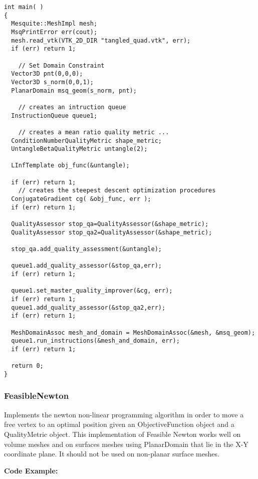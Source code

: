 \begin{lstlisting}[frame=single]
int main( )
{
  Mesquite::MeshImpl mesh;
  MsqPrintError err(cout);
  mesh.read_vtk(VTK_2D_DIR "tangled_quad.vtk", err);
  if (err) return 1;
  
    // Set Domain Constraint
  Vector3D pnt(0,0,0);
  Vector3D s_norm(0,0,1);
  PlanarDomain msq_geom(s_norm, pnt);
                                                                              
    // creates an intruction queue
  InstructionQueue queue1;
  
    // creates a mean ratio quality metric ...
  ConditionNumberQualityMetric shape_metric;
  UntangleBetaQualityMetric untangle(2);

  LInfTemplate obj_func(&untangle);

  if (err) return 1;
    // creates the steepest descent optimization procedures
  ConjugateGradient cg( &obj_func, err );
  if (err) return 1;
  
  QualityAssessor stop_qa=QualityAssessor(&shape_metric);
  QualityAssessor stop_qa2=QualityAssessor(&shape_metric);
   
  stop_qa.add_quality_assessment(&untangle);

  queue1.add_quality_assessor(&stop_qa,err); 
  if (err) return 1;
 
  queue1.set_master_quality_improver(&cg, err);
  if (err) return 1;
  queue1.add_quality_assessor(&stop_qa2,err);
  if (err) return 1;

  MeshDomainAssoc mesh_and_domain = MeshDomainAssoc(&mesh, &msq_geom);
  queue1.run_instructions(&mesh_and_domain, err);
  if (err) return 1;
  
  return 0;
}
\end{lstlisting}


\subsubsection{FeasibleNewton}
Implements the newton non-linear programming algorithm in order to move a free vertex to an optimal position given an ObjectiveFunction object and a QualityMetric object.  This implementation of Feasible Newton works well on volume meshes and on surfaces meshes using PlanarDomain that lie in the X-Y coordinate plane. It should not be used on non-planar surface meshes.

\textbf{Code Example:}

